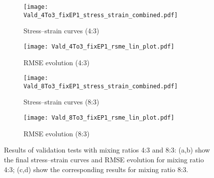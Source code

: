 \begin{figure}[H]
\centering

\begin{subfigure}[t]{0.495\textwidth}
    \centering
    \texttt{[image: Vald\_4To3\_fixEP1\_stress\_strain\_combined.pdf]}
    \caption{Stress–strain curves (4:3)}
    \label{fig:validation_stress_strain_4to3}
\end{subfigure}
\hfill
\begin{subfigure}[t]{0.495\textwidth}
    \centering
    \texttt{[image: Vald\_4To3\_fixEP1\_rsme\_lin\_plot.pdf]}
    \caption{RMSE evolution (4:3)}
    \label{fig:validation_rmse_4to3}
\end{subfigure}

\vspace{1em} %

\begin{subfigure}[t]{0.495\textwidth}
    \centering
    \texttt{[image: Vald\_8To3\_fixEP1\_stress\_strain\_combined.pdf]}
    \caption{Stress–strain curves (8:3)}
    \label{fig:validation_stress_strain_8to3}
\end{subfigure}
\hfill
\begin{subfigure}[t]{0.495\textwidth}
    \centering
    \texttt{[image: Vald\_8To3\_fixEP1\_rsme\_lin\_plot.pdf]}
    \caption{RMSE evolution (8:3)}
    \label{fig:validation_rmse_8to3}
\end{subfigure}

\caption{Results of validation tests with mixing ratios 4:3 and 8:3:
(a,b) show the final stress–strain curves and RMSE evolution for mixing ratio 4:3;
(c,d) show the corresponding results for mixing ratio 8:3.}
\label{fig:validation_results}
\end{figure}

